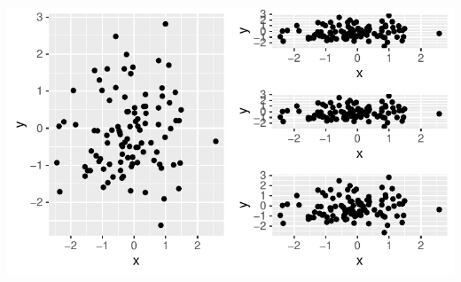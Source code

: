 \documentclass{article}\usepackage[]{graphicx}\usepackage[]{xcolor}
\makeatletter
\def\maxwidth{ %
  \ifdim\Gin@nat@width>\linewidth
    \linewidth
  \else
    \Gin@nat@width
  \fi
}
\newenvironment{knitrout}{}{} %
\makeatother
\begin{document}
\begin{knitrout}
{\centering \includegraphics[width=\maxwidth]{figure/unnamed-chunk-1-2} 

}


\end{knitrout}
\end{document}
